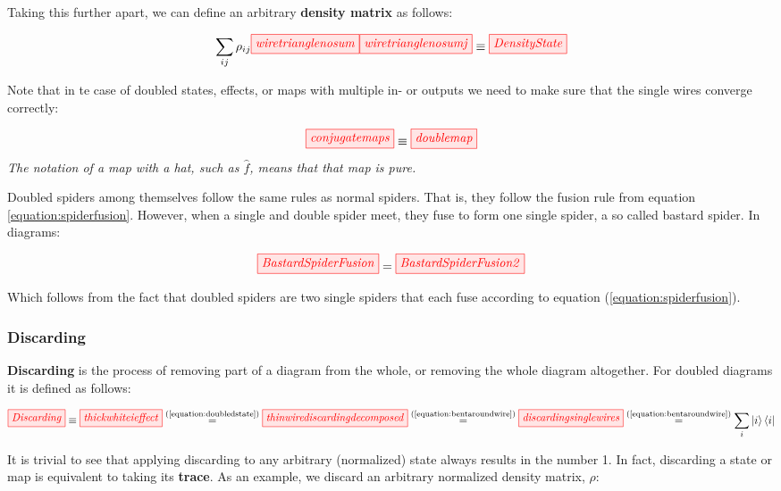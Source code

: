 \documentclass[]{article}
\newcommand{\equaltext}[1]{\ensuremath{\stackrel{\text{#1}}{=}}}
\begin{document}
Taking this further apart, we can define an arbitrary \textbf{density matrix} as follows:

\begin{equation}
	\label{equation:densitymatrix}
	 \sum\limits_{ij} \rho_{ij} \tikzfig{wiretrianglenosum} \tikzfig{wiretrianglenosumj} \equiv \tikzfig{DensityState}
\end{equation}

Note that in te case of doubled states, effects, or maps with multiple in- or outputs we need to make sure that the single wires converge correctly:

\begin{equation}
\label{equation:conjugatemaps}
\tikzfig{conjugatemaps} \equiv \tikzfig{doublemap}
\end{equation}
\textit{The notation of a map with a hat, such as $\hat{f}$, means that that map is pure.}

Doubled spiders among themselves follow the same rules as normal spiders. That is, they follow the fusion rule from equation \ref{equation:spiderfusion}. However, when a single and double spider meet, they fuse to form one single spider, a so called bastard spider. In diagrams:

\begin{equation}
\label{equation:bastardspiderfusion}
	\tikzfig{BastardSpiderFusion} = \tikzfig{BastardSpiderFusion2}
\end{equation}

Which follows from the fact that doubled spiders are two single spiders that each fuse according to equation (\ref{equation:spiderfusion}).
\subsubsection{Discarding}
\label{discarding}

\textbf{Discarding} is the process of removing part of a diagram from the whole, or removing the whole diagram altogether. For doubled diagrams it is defined as follows:

\begin{equation}
\label{equation:discarding}
\tikzfig{Discarding} \equiv \tikzfig{thickwhiteieffect} \equaltext{(\ref{equation:doubledstate})} \tikzfig{thinwirediscardingdecomposed} 
\equaltext{(\ref{equation:bentaroundwire})}
 \tikzfig{discardingsinglewires} \equaltext{(\ref{equation:bentaroundwire})} \sum\limits_{i}\ket{i}\bra{i}
\end{equation}

It is trivial to see that applying discarding to any arbitrary (normalized) state always results in the number 1. In fact, discarding a state or map is equivalent to taking its \textbf{trace}. As an example, we discard an arbitrary normalized density matrix, $\rho$:
\end{document}
